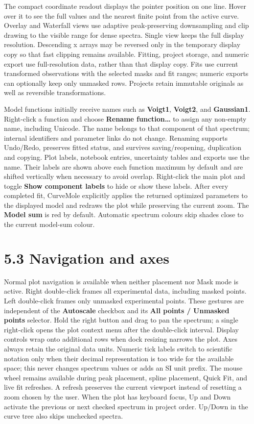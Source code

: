 \documentclass[
  10pt,
  a4paper,
  oneside]{scrreprt}
\begin{document}
The compact coordinate readout displays the pointer position on one
line. Hover over it to see the full values and the nearest finite point
from the active curve. Overlay and Waterfall views use adaptive
peak-preserving downsampling and clip drawing to the visible range for
dense spectra. Single view keeps the full display resolution. Descending
x arrays may be reversed only in the temporary display copy so that fast
clipping remains available. Fitting, project storage, and numeric export
use full-resolution data, rather than that display copy. Fits use
current transformed observations with the selected masks and fit ranges;
numeric exports can optionally keep only unmasked rows. Projects retain
immutable originals as well as reversible transformations.

Model functions initially receive names such as \textbf{Voigt1},
\textbf{Voigt2}, and \textbf{Gaussian1}. Right-click a function and
choose \textbf{Rename function\ldots{}} to assign any non-empty name,
including Unicode. The name belongs to that component of that spectrum;
internal identifiers and parameter links do not change. Renaming
supports Undo/Redo, preserves fitted status, and survives
saving/reopening, duplication and copying. Plot labels, notebook
entries, uncertainty tables and exports use the name. Their labels are
shown above each function maximum by default and are shifted vertically
when necessary to avoid overlap. Right-click the main plot and toggle
\textbf{Show component labels} to hide or show these labels. After every
completed fit, CurveMole explicitly applies the returned optimized
parameters to the displayed model and redraws the plot while preserving
the current zoom. The \textbf{Model sum} is red by default. Automatic
spectrum colours skip shades close to the current model-sum colour.

\hypertarget{navigation-and-axes}{%
\section{5.3 Navigation and axes}\label{navigation-and-axes}}

Normal plot navigation is available when neither placement nor Mask mode
is active. Right double-click frames all experimental data, including
masked points. Left double-click frames only unmasked experimental
points. These gestures are independent of the \textbf{Autoscale}
checkbox and its \textbf{All points / Unmasked points} selector. Hold
the right button and drag to pan the spectrum; a single right-click
opens the plot context menu after the double-click interval. Display
controls wrap onto additional rows when dock resizing narrows the plot.
Axes always retain the original data units. Numeric tick labels switch
to scientific notation only when their decimal representation is too
wide for the available space; this never changes spectrum values or adds
an SI unit prefix. The mouse wheel remains available during peak
placement, spline placement, Quick Fit, and live fit refreshes. A
refresh preserves the current viewport instead of resetting a zoom
chosen by the user. When the plot has keyboard focus, Up and Down
activate the previous or next checked spectrum in project order. Up/Down
in the curve tree also skips unchecked spectra.
\end{document}
